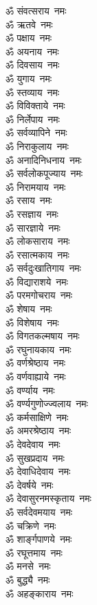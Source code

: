 \begin{multicols}{2}
\begin{flushleft}
ॐ संवत्सराय~नमः\\
ॐ ऋतवे~नमः\\
ॐ पक्षाय~नमः\\
ॐ अयनाय~नमः\\
ॐ दिवसाय~नमः\\
ॐ युगाय~नमः\\
ॐ स्तव्याय~नमः\\
ॐ विविक्ताये~नमः\\
ॐ निर्लेपाय~नमः\hfill{}\\
ॐ सर्वव्यापिने~नमः\\
ॐ निराकुलाय~नमः\\
ॐ अनादिनिधनाय~नमः\\
ॐ सर्वलोकपूज्याय~नमः\\
ॐ निरामयाय~नमः\\
ॐ रसाय~नमः\\
ॐ रसज्ञाय~नमः\\
ॐ सारज्ञाये~नमः\\
ॐ लोकसाराय~नमः\\
ॐ रसात्मकाय~नमः\hfill{}\\
ॐ सर्वदुःखातिगाय~नमः\\
ॐ विद्याराशये~नमः\\
ॐ परमगोचराय~नमः\\
ॐ शेषाय~नमः\\
ॐ विशेषाय~नमः\\
ॐ विगतकल्मषाय~नमः\\
ॐ रघुनायकाय~नमः\\
ॐ वर्णश्रेष्ठाय~नमः\\
ॐ वर्णवाह्याये~नमः\\
ॐ वर्ण्याय~नमः\hfill{}\\
ॐ वर्ण्यगुणोज्ज्वलाय~नमः\\
ॐ कर्मसाक्षिणे~नमः\\
ॐ अमरश्रेष्ठाय~नमः\\
ॐ देवदेवाय~नमः\\
ॐ सुखप्रदाय~नमः\\
ॐ देवाधिदेवाय~नमः\\
ॐ देवर्षये~नमः\\
ॐ देवासुरनमस्कृताय~नमः\\
ॐ सर्वदेवमयाय~नमः\\
ॐ चक्रिणे~नमः\hfill{}\\
ॐ शार्ङ्गपाणये~नमः\\
ॐ रघूत्तमाय~नमः\\
ॐ मनसे~नमः\\
ॐ बुद्ध्यै~नमः\\
ॐ अहङ्काराय~नमः\\

\end{flushleft}
\end{multicols}
